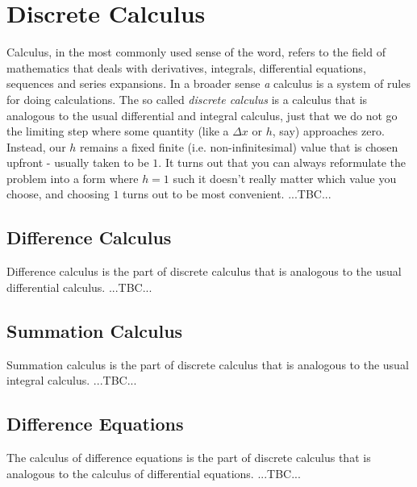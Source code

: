 \chapter{Discrete Calculus}
Calculus, in the most commonly used sense of the word, refers to the field of mathematics that deals with derivatives, integrals, differential equations, sequences and series expansions. In a broader sense \emph{a} calculus is a system of rules for doing calculations. The so called \emph{discrete calculus} is a calculus that is analogous to the usual differential and integral calculus, just that we do not go the limiting step where some quantity (like a $\Delta x$ or $h$, say) approaches zero. Instead, our $h$ remains a fixed finite (i.e. non-infinitesimal) value that is chosen upfront - usually taken to be $1$. It turns out that you can always reformulate the problem into a form where $h = 1$ such it doesn't really matter which value you choose, and choosing $1$ turns out to be most convenient. ...TBC...




\section{Difference Calculus}
Difference calculus is the part of discrete calculus that is analogous to the usual differential calculus. ...TBC...


\section{Summation Calculus}
Summation calculus is the part of discrete calculus that is analogous to the usual integral calculus. ...TBC...





\section{Difference Equations}
The calculus of difference equations is the part of discrete calculus that is analogous to the calculus of differential equations. ...TBC...


